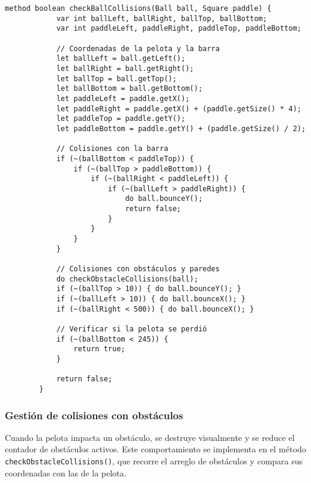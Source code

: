 \documentclass[twocolumn]{article}
\begin{document}
	\begin{lstlisting}[caption=Verificación de colisiones principales]
		method boolean checkBallCollisions(Ball ball, Square paddle) {
			var int ballLeft, ballRight, ballTop, ballBottom;
			var int paddleLeft, paddleRight, paddleTop, paddleBottom;
			
			// Coordenadas de la pelota y la barra
			let ballLeft = ball.getLeft();
			let ballRight = ball.getRight();
			let ballTop = ball.getTop();
			let ballBottom = ball.getBottom();
			let paddleLeft = paddle.getX();
			let paddleRight = paddle.getX() + (paddle.getSize() * 4);
			let paddleTop = paddle.getY();
			let paddleBottom = paddle.getY() + (paddle.getSize() / 2);
			
			// Colisiones con la barra
			if (~(ballBottom < paddleTop)) {
				if (~(ballTop > paddleBottom)) {
					if (~(ballRight < paddleLeft)) {
						if (~(ballLeft > paddleRight)) {
							do ball.bounceY();
							return false;
						}
					}
				}
			}
			
			// Colisiones con obstáculos y paredes
			do checkObstacleCollisions(ball);
			if (~(ballTop > 10)) { do ball.bounceY(); }
			if (~(ballLeft > 10)) { do ball.bounceX(); }
			if (~(ballRight < 500)) { do ball.bounceX(); }
			
			// Verificar si la pelota se perdió
			if (~(ballBottom < 245)) {
				return true;
			}
			
			return false;
		}
	\end{lstlisting}
	
	\subsubsection{Gestión de colisiones con obstáculos}
	Cuando la pelota impacta un obstáculo, se destruye visualmente y se reduce el contador de obstáculos activos. Este comportamiento se implementa en el método \texttt{checkObstacleCollisions()}, que recorre el arreglo de obstáculos y compara sus coordenadas con las de la pelota.
	
\end{document}
